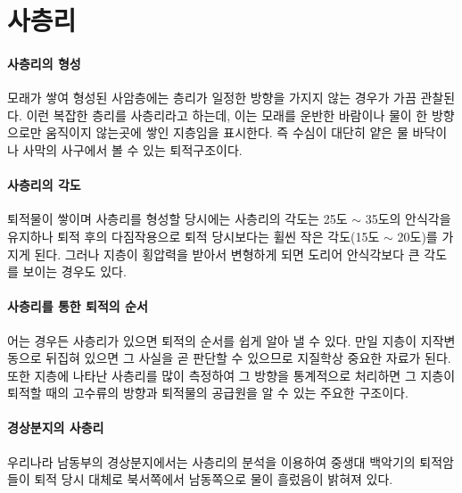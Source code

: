 \documentclass[12pt, a4paper, twoside]{book}
\begin{document}
	\clearpage
	\section{사층리}



		\paragraph{사층리의 형성}
		모래가 쌓여 형성된 사암층에는 층리가 일정한 방향을 가지지 않는 경우가 가끔 관찰된다.
		이런 복잡한 층리를 사층리라고 하는데, 이는 모래를 운반한 바람이나 물이 한 방향으로만 움직이지 않는곳에 쌓인 지층임을 표시한다.
		즉 수심이 대단히 얕은 물 바닥이나 사막의 사구에서 볼 수 있는 퇴적구조이다.

		
		\paragraph{사층리의 각도}
		퇴적물이 쌓이며 사층리를 형성할 당시에는 사층리의 각도는 25도 $\sim$ 35도의 안식각을 유지하나 
		퇴적 후의 다짐작용으로 퇴적 당시보다는 휠씬 작은 각도(15도 $\sim$ 20도)를 가지게 된다.
		그러나 지층이 횡압력을 받아서 변형하게 되면 도리어 안식각보다 큰 각도를 보이는 경우도 있다.

		\paragraph{사층리를 통한 퇴적의 순서}
		어는 경우든 사층리가 있으면 퇴적의 순서를 쉽게 알아 낼 수 있다.
		만일 지층이 지작변동으로 뒤집혀 있으면 그 사실을 곧 판단할 수 있으므로 지질학상 중요한 자료가 된다.
		또한 지층에 나타난 사층리를 많이 측정하여 그 방향을 통계적으로 처리하면 
		그 지층이 퇴적할 때의 고수류의 방향과 퇴적물의 공급원을 알 수 있는 주요한 구조이다.


		\paragraph{경상분지의 사층리}
		우리나라 남동부의 경상분지에서는 사층리의 분석을 이용하여 
		중생대 백악기의 퇴적암들이 퇴적 당시 대체로 북서쪽에서 남동쪽으로 물이 흘렀음이 밝혀져 있다.







	\clearpage
\end{document}

